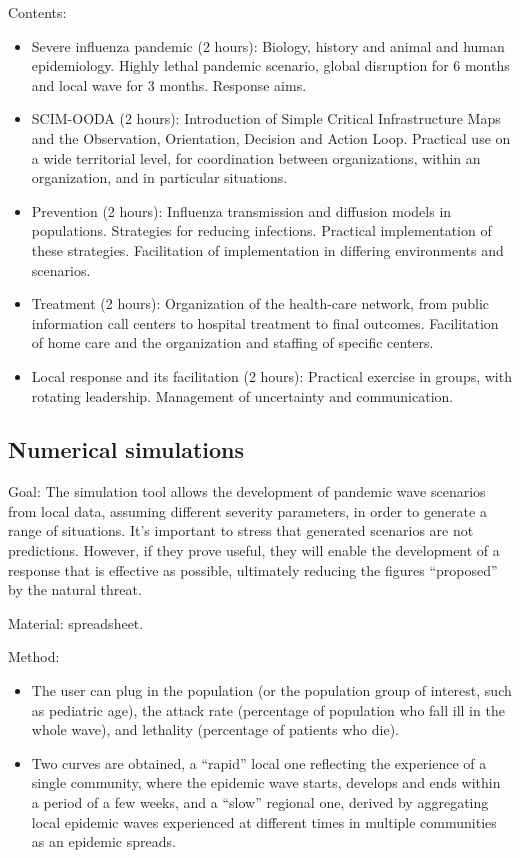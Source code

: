 \documentclass[12pt, a4]{scrartcl}
\begin{document}
Contents:
\begin{itemize}
	\item Severe influenza pandemic (2 hours): Biology, history and animal and human epidemiology. Highly lethal pandemic scenario, global disruption for 6 months and local wave for 3 months. Response aims.
	\item SCIM-OODA (2 hours): Introduction of Simple Critical Infrastructure Maps and the Observation, Orientation, Decision and Action Loop. Practical use on a wide territorial level, for coordination between organizations, within an organization, and in particular situations.
	\item Prevention (2 hours): Influenza transmission and diffusion models in populations. Strategies for reducing infections. Practical implementation of these strategies. Facilitation of implementation in differing environments and scenarios.
	\item Treatment (2 hours): Organization of the health-care network, from public information call centers to hospital treatment to final outcomes. Facilitation of home care and the organization and staffing of specific centers.
	\item Local response and its facilitation (2 hours): Practical exercise in groups, with rotating leadership. Management of uncertainty and communication.
\end{itemize}

\subsection{Numerical simulations}
Goal: The simulation tool allows the development of pandemic wave scenarios from local data, assuming different severity parameters, in order to generate a range of situations. It’s important to stress that generated scenarios are not predictions. However, if they prove useful, they will enable the development of a response that is effective as possible, ultimately reducing the figures “proposed” by the natural threat.

Material: spreadsheet.

Method:
\begin{itemize}
	\item The user can plug in the population (or the population group of interest, such as pediatric age), the attack rate (percentage of population who fall ill in the whole wave), and lethality (percentage of patients who die).
	\item Two curves are obtained, a “rapid” local one reflecting the experience of a single community, where the epidemic wave starts, develops and ends within a period of a few weeks, and a “slow” regional one, derived by aggregating local epidemic waves experienced at different times in multiple communities as an epidemic spreads.
\end{itemize}
\end{document}
